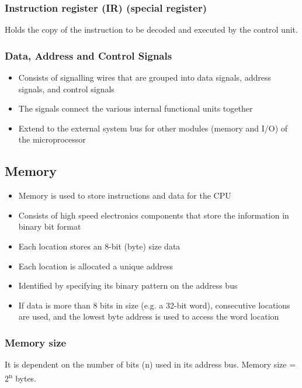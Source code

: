 \documentclass[11pt]{article}
\begin{document}
\subsubsection{Instruction register (IR) (special register)}
\label{sec:org3ba2ad6}
Holds the copy of the instruction to be decoded and executed by the control unit.

\subsubsection{Data, Address and Control Signals}
\label{sec:org639290d}
\begin{itemize}
\item Consists of signalling wires that are grouped into data signals, address signals, and control signals
\item The signals connect the various internal functional units together
\item Extend to the external system bus for other modules (memory and I/O) of the microprocessor
\end{itemize}

\subsection{Memory}
\label{sec:orgdebcea6}
\begin{itemize}
\item Memory is used to store instructions and data for the CPU
\item Consists of high speed electronics components that store the information in binary bit format
\item Each location stores an 8-bit (byte) size data
\item Each location is allocated a unique address
\item Identified by specifying its binary pattern on the address bus
\item If data is more than 8 bits in size (e.g. a 32-bit word), consecutive locations are used, and the lowest byte address is used to access the word location
\end{itemize}

\subsubsection{Memory size}
\label{sec:orgc0026e6}
It is dependent on the number of bits (n) used in its address bus. Memory size = 2\textsuperscript{n} bytes.
\end{document}
